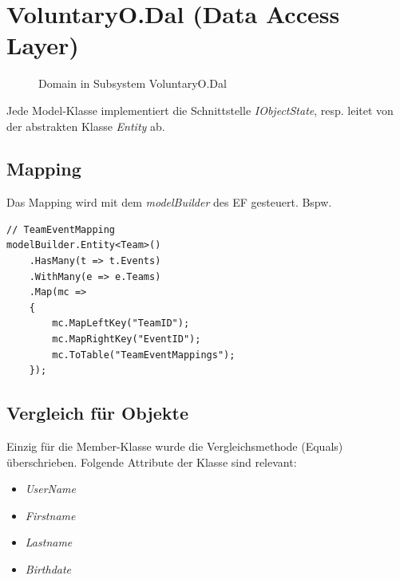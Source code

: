 \section{VoluntaryO.Dal (Data Access Layer)}
    \begin{figure}[h]
  		\vspace{-5pt}
    	\centering
  		\vspace{-25pt}
    	\caption{Domain in Subsystem VoluntaryO.Dal}
	\end{figure}
	Jede Model-Klasse implementiert die Schnittstelle \textit{IObjectState}, resp. leitet von der abstrakten Klasse \textit{Entity} ab.

	\subsection{Mapping}
	Das Mapping wird mit dem \textit{modelBuilder} des EF gesteuert. Bspw.
	\begin{lstlisting}[language=CSharp, caption=Mapping in VoluntaryoContext.cs, label=lst:mappingcontextcs, firstnumber=1]
// TeamEventMapping
modelBuilder.Entity<Team>()
    .HasMany(t => t.Events)
    .WithMany(e => e.Teams)
    .Map(mc =>
    {
        mc.MapLeftKey("TeamID");
        mc.MapRightKey("EventID");
        mc.ToTable("TeamEventMappings");
    });
    \end{lstlisting}

	\subsection{Vergleich für Objekte}
	Einzig für die Member-Klasse wurde die Vergleichsmethode (Equals) überschrieben. Folgende Attribute der Klasse sind relevant:
	\\\begin{itemize}
		\item \textit{UserName}
		\item \textit{Firstname}
		\item \textit{Lastname}
		\item \textit{Birthdate}
	\end{itemize}

